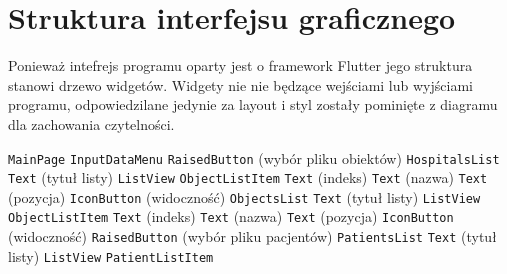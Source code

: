 \documentclass{article}
\newcommand\tab[1][1cm]{\hspace*{#1}}
\begin{document}
\section{Struktura interfejsu graficznego}
Ponieważ intefrejs programu oparty jest o framework Flutter jego struktura stanowi drzewo widgetów. Widgety nie nie będzące wejściami lub wyjściami programu, odpowiedzilane jedynie za layout i styl zostały pominięte z diagramu dla zachowania czytelności. \newline

\texttt{MainPage} \newline
\tab\texttt{InputDataMenu} \newline
\tab\tab\texttt{RaisedButton} (wybór pliku obiektów) \newline
\tab\tab\texttt{HospitalsList} \newline
\tab\tab\tab\texttt{Text} (tytuł listy) \newline
\tab\tab\tab\texttt{ListView} \newline
\tab\tab\tab\tab\texttt{ObjectListItem} \newline
\tab\tab\tab\tab\tab\texttt{Text} (indeks) \newline
\tab\tab\tab\tab\tab\texttt{Text} (nazwa) \newline
\tab\tab\tab\tab\tab\texttt{Text} (pozycja) \newline
\tab\tab\tab\tab\tab\texttt{IconButton} (widoczność) \newline
\tab\tab\texttt{ObjectsList} \newline
\tab\tab\tab\texttt{Text} (tytuł listy) \newline
\tab\tab\tab\texttt{ListView} \newline
\tab\tab\tab\tab\texttt{ObjectListItem} \newline
\tab\tab\tab\tab\tab\texttt{Text} (indeks) \newline
\tab\tab\tab\tab\tab\texttt{Text} (nazwa) \newline
\tab\tab\tab\tab\tab\texttt{Text} (pozycja) \newline
\tab\tab\tab\tab\tab\texttt{IconButton} (widoczność) \newline
\tab\tab\texttt{RaisedButton} (wybór pliku pacjentów) \newline
\tab\tab\texttt{PatientsList} \newline
\tab\tab\tab\texttt{Text} (tytuł listy) \newline
\tab\tab\tab\texttt{ListView} \newline
\tab\tab\tab\tab\texttt{PatientListItem} \newline
\end{document}
